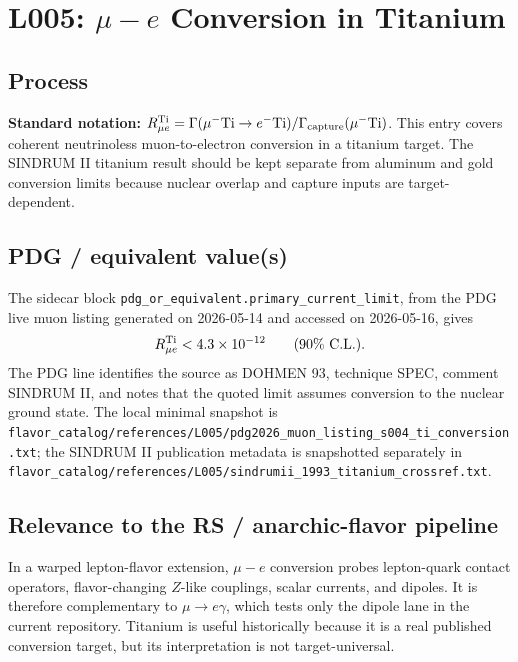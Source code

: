 
\section{L005: \texorpdfstring{\(\mu-e\)}{mu-e} Conversion in Titanium}

\subsection*{Process}
\textbf{Standard notation:} \(R_{\mu e}^{\rm Ti} =
\Gamma(\mu^-{\rm Ti}\to e^-{\rm Ti})/\Gamma_{\rm capture}(\mu^-{\rm Ti})\).
This entry covers coherent neutrinoless muon-to-electron conversion in a
titanium target.  The SINDRUM II titanium result should be kept separate from
aluminum and gold conversion limits because nuclear overlap and capture inputs
are target-dependent.

\subsection*{PDG / equivalent value(s)}
The sidecar block \texttt{pdg\_or\_equivalent.primary\_current\_limit}, from
the PDG live muon listing generated on 2026-05-14 and accessed on 2026-05-16,
gives
\[
  R_{\mu e}^{\rm Ti}<4.3\times10^{-12}\qquad (90\%\ {\rm C.L.}) .
\]
The PDG line identifies the source as DOHMEN 93, technique SPEC, comment
SINDRUM II, and notes that the quoted limit assumes conversion to the nuclear
ground state.  The local minimal snapshot is
\texttt{flavor\_catalog/references/L005/pdg2026\_muon\_listing\_s004\_ti\_conversion.txt};
the SINDRUM II publication metadata is snapshotted separately in
\texttt{flavor\_catalog/references/L005/sindrumii\_1993\_titanium\_crossref.txt}.

\subsection*{Relevance to the RS / anarchic-flavor pipeline}
In a warped lepton-flavor extension, \(\mu-e\) conversion probes lepton-quark
contact operators, flavor-changing \(Z\)-like couplings, scalar currents, and
dipoles.  It is therefore complementary to \(\mu\to e\gamma\), which tests only
the dipole lane in the current repository.  Titanium is useful historically
because it is a real published conversion target, but its interpretation is
not target-universal.

